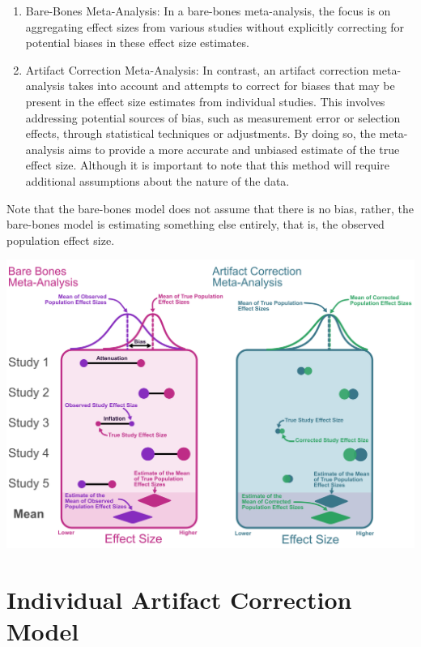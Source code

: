 \documentclass[
  letterpaper,
  DIV=11,
  numbers=noendperiod]{scrreprt}
\begin{document}
\begin{enumerate}
\def\labelenumi{\arabic{enumi}.}
\item
  Bare-Bones Meta-Analysis: In a bare-bones meta-analysis, the focus is
  on aggregating effect sizes from various studies without explicitly
  correcting for potential biases in these effect size estimates.
\item
  Artifact Correction Meta-Analysis: In contrast, an artifact correction
  meta-analysis takes into account and attempts to correct for biases
  that may be present in the effect size estimates from individual
  studies. This involves addressing potential sources of bias, such as
  measurement error or selection effects, through statistical techniques
  or adjustments. By doing so, the meta-analysis aims to provide a more
  accurate and unbiased estimate of the true effect size. Although it is
  important to note that this method will require additional assumptions
  about the nature of the data.
\end{enumerate}

Note that the bare-bones model does not assume that there is no bias,
rather, the bare-bones model is estimating something else entirely, that
is, the observed population effect size.

\includegraphics{figure/correction_forest.png}

\hypertarget{individual-artifact-correction-model}{%
\section{Individual Artifact Correction
Model}\label{individual-artifact-correction-model}}
\end{document}

